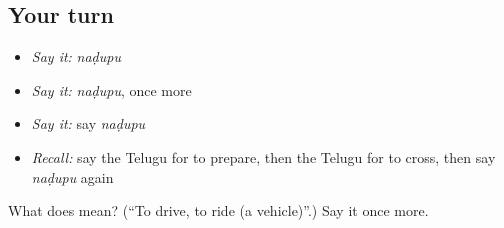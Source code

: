 \subsection*{Your turn}
\begin{itemize}
\raggedright
  \item \emph{Say it:} \emph{naḍupu}
  \item \emph{Say it:} \emph{naḍupu}, once more
  \item \emph{Say it:} say \emph{naḍupu}
  \item \emph{Recall:} say the Telugu for to prepare, then the Telugu for to cross, then say \emph{naḍupu} again
\end{itemize}

\begin{tcolorbox}[breakable,colback=teal!4,colframe=teal!35!black,title={Before you move on}]
What does  mean? (\textquotedblleft{}To drive, to ride (a vehicle)\textquotedblright{}.) Say it once more.
\end{tcolorbox}
